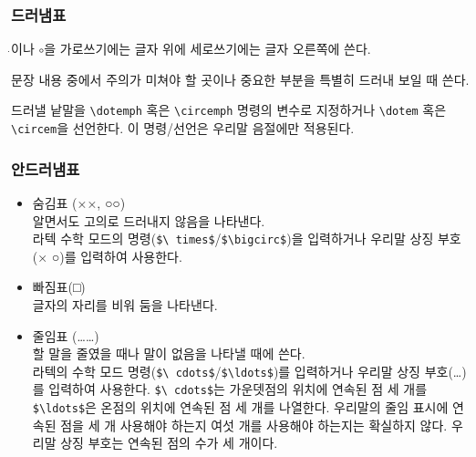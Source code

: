 \subsubsection{드러냄표}

\noindent
$\dot{}$이나 $\scriptscriptstyle\circ$을 가로쓰기에는 글자 위에
세로쓰기에는 글자 오른쪽에 쓴다.

\noindent
문장 내용 중에서 주의가 미쳐야 할 곳이나 중요한 부분을 특별히 드러내
보일 때 쓴다.

\noindent
드러낼 낱말을 \texttt{\textbackslash dotemph} 혹은
\texttt{\textbackslash circemph} 명령의 변수로 지정하거나
\texttt{\textbackslash dotem} 혹은 \texttt{\textbackslash circem}을
선언한다.  이 명령/선언은 우리말 음절에만 적용된다.



\subsubsection{안드러냄표}

\begin{itemize}
\item 숨김표 (××, ○○)\\
  알면서도 고의로 드러내지 않음을 나타낸다.\\
  라텍 수학 모드의 명령(\texttt{\$\textbackslash
    times\$}/\texttt{\$\textbackslash bigcirc\$})을 입력하거나 우리말
  상징 부호(× ○)를 입력하여 사용한다.

\item 빠짐표(□)\\
  글자의 자리를 비워 둠을 나타낸다.

\item 줄임표 (……)\\
  할 말을 줄였을 때나 말이 없음을 나타낼 때에 쓴다.\\
  라텍의 수학 모드 명령(\texttt{\$\textbackslash
    cdots\$}/\texttt{\$\textbackslash ldots\$})를 입력하거나 우리말
  상징 부호(…)를 입력하여 사용한다.  \texttt{\$\textbackslash
    cdots\$}는 가운뎃점의 위치에 연속된 점 세 개를
  \texttt{\$\textbackslash ldots\$}은 온점의 위치에 연속된 점 세 개를
  나열한다.  우리말의 줄임 표시에 연속된 점을 세 개 사용해야 하는지
  여섯 개를 사용해야 하는지는 확실하지 않다.  우리말 상징 부호는 연속된
  점의 수가 세 개이다.

\end{itemize}

